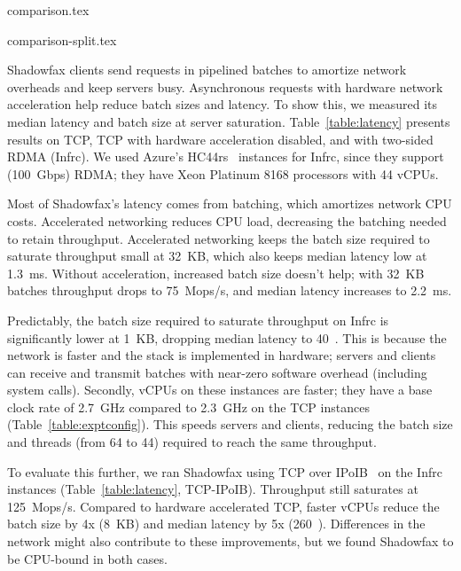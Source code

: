  {comparison.tex}

 {comparison-split.tex}

Shadowfax clients send requests in pipelined batches to amortize
network overheads and keep servers busy.
%
Asynchronous requests with hardware network acceleration
help reduce batch sizes and latency.
%
To show this, we measured its median latency and batch size at
server saturation.
%
%
Table~\ref{table:latency} presents results on TCP, TCP with
hardware acceleration disabled, and with two-sided RDMA (Infrc).
%
We used Azure's HC44rs~\cite{hc44} instances for Infrc, since they support
(100~Gbps) RDMA; they have Xeon Platinum 8168 processors with 44 vCPUs.
%
%
%

Most of Shadowfax's latency comes from batching, which amortizes network CPU
costs. Accelerated networking reduces CPU load, decreasing the batching
needed to retain throughput.
%
%
Accelerated networking keeps the batch size required to saturate
throughput small at 32~KB, which also keeps median latency low at 1.3~ms.
%
%
Without acceleration, increased batch size doesn't help; with 32~KB
batches throughput drops to 75~Mops/s, and median latency increases to 2.2~ms.

Predictably, the batch size required to saturate throughput on Infrc is
significantly lower at 1~KB, dropping median latency to 40~\us.
%
This is because the network is faster and the stack is implemented in hardware;
servers and clients can receive and transmit batches with near-zero
software overhead (including system calls).
%
Secondly, vCPUs on these instances are faster; they have a base clock rate of
2.7~GHz compared to 2.3~GHz on the TCP instances
(Table~\ref{table:exptconfig}).
%
This speeds servers and clients, reducing the batch size and
threads (from 64 to 44) required to reach the same throughput.

To evaluate this further, we ran Shadowfax using TCP over IPoIB~\cite{ipoib} on
the Infrc instances (Table~\ref{table:latency}, TCP-IPoIB).
%
Throughput still saturates at 125~Mops/s.
%
Compared to hardware accelerated TCP, faster vCPUs reduce the batch size
by 4x (8~KB) and median latency by 5x (260~\us).
%
Differences in the network might also contribute to these improvements,
but we found Shadowfax to be CPU-bound in both cases.

